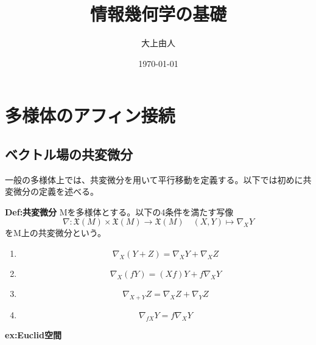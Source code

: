 \documentclass[a4paper,11pt]{jsarticle}
\numberwithin{equation}{section}
\begin{document}
\title{情報幾何学の基礎}
\author{大上由人}
\date{\today}
\maketitle

\section{多様体のアフィン接続}
\subsection{ベクトル場の共変微分}
一般の多様体上では、共変微分を用いて平行移動を定義する。以下では初めに共変微分の定義を述べる。

\begin{itembox}[l]{\textbf{Def:共変微分}}
    Mを多様体とする。以下の4条件を満たす写像
    \begin{equation}
        \nabla : \mathfrak{X}(M) \times \mathfrak{X}(M) \to \mathfrak{X}(M) \quad (X,Y) \mapsto \nabla_XY
    \end{equation}
    をM上の共変微分という。
    \begin{enumerate}
        \item 
        \begin{equation}
            \nabla_X(Y+Z) = \nabla_XY + \nabla_XZ
        \end{equation}

        \item
        \begin{equation}
            \nabla_X(fY) = (Xf)Y + f\nabla_XY
        \end{equation}

        \item
        \begin{equation}
            \nabla_{X+Y}Z = \nabla_XZ + \nabla_YZ
        \end{equation}

        \item
        \begin{equation}
            \nabla_{fX}Y = f\nabla_XY
        \end{equation}
    \end{enumerate}
\end{itembox}
\textbf{ex:Euclid空間}\\
\end{document}
